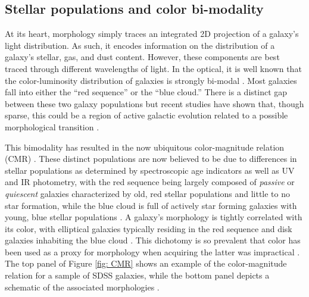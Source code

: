 \subsection{Stellar populations and color bi-modality}
\label{sec: stellar populations}

At its heart, morphology simply traces an integrated 2D projection of a galaxy's light distribution. As such, it encodes information on the distribution of a galaxy's stellar, gas, and dust content. However, these components are best traced through different wavelengths of light. In the optical, it is well known that the color-luminosity distribution of galaxies is strongly bi-modal \citep{Baldry2004b}. Most galaxies fall into either the ``red sequence'' or the ``blue cloud.'' There is a distinct gap between these two galaxy populations but recent studies have shown that, though sparse, this could be a region of active galactic evolution related to a possible morphological transition \citep{Schawinski2007}.

This bimodality has resulted in the now ubiquitous color-magnitude relation (CMR) \citep{Baldry2004a, Bell2004}. These distinct populations are now believed to be due to differences in stellar populations as determined by spectroscopic age indicators as well as UV and IR photometry, with the red sequence being largely composed of \textit{passive} or \textit{quiescent} galaxies characterized by old, red stellar populations and little to no star formation, while the blue cloud is full of actively star forming galaxies with young, blue stellar populations \citep{Brinchmann2004,Kauffman2003,Salim2007,Schiminovich2007}. A galaxy's morphology is tightly correlated with its color, with elliptical galaxies typically residing in the red sequence and disk galaxies inhabiting the blue cloud \citep[e.g.,][]{Strateva2001,Baldry2004b, Cirasuolo2007, Lee2013, Taylor2015}.  This dichotomy is so prevalent that color has been used as a proxy for morphology when acquiring the latter was impractical \citep[e.g.,][]{Shen2003, Blanton2003c}.  The top panel of Figure \ref{fig: CMR} shows an example of the color-magnitude relation for a sample of SDSS galaxies, while the bottom panel depicts a schematic of the associated morphologies \citep[adapted from][]{Kormendy2012}. 



